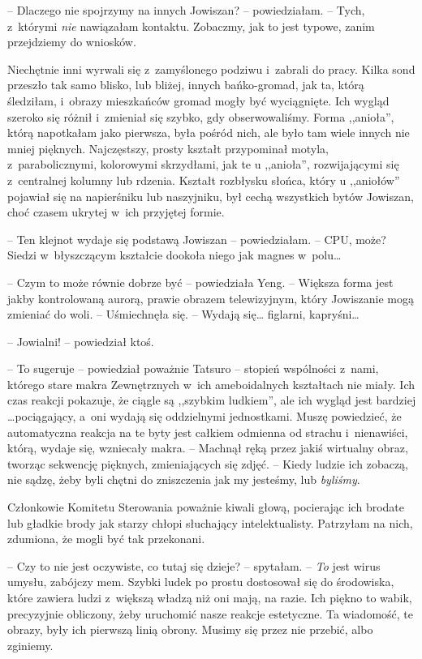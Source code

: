 \documentclass[oneside,polish,11pt,sfheadings]{mwbk}
\begin{document}
-- Dlaczego nie spojrzymy na innych Jowiszan? -- powiedziałam. -- Tych, z~którymi \textit{nie} nawiązałam kontaktu. Zobaczmy, jak to jest typowe,
zanim przejdziemy do wniosków.

Niechętnie inni wyrwali się z~zamyślonego podziwu i~zabrali do pracy.
Kilka sond przeszło tak samo blisko, lub bliżej, innych bańko-gromad,
jak ta, którą śledziłam, i~obrazy mieszkańców gromad mogły być
wyciągnięte. Ich wygląd szeroko się różnił i~zmieniał się szybko, gdy
obserwowaliśmy. Forma ,,anioła'', którą napotkałam jako pierwsza, była
pośród nich, ale było tam wiele innych nie mniej pięknych. Najczęstszy,
prosty kształt przypominał motyla, z~parabolicznymi, kolorowymi
skrzydłami, jak te u ,,anioła'', rozwijającymi się z~centralnej kolumny
lub rdzenia. Kształt rozbłysku słońca, który u ,,aniołów'' pojawiał się
na napierśniku lub naszyjniku, był cechą wszystkich bytów Jowiszan, choć
czasem ukrytej w~ich przyjętej formie.

-- Ten klejnot wydaje się podstawą Jowiszan -- powiedziałam. -- CPU, może?
Siedzi w~błyszczącym kształcie dookoła niego jak magnes w~polu\ldots 

-- Czym to może równie dobrze być -- powiedziała Yeng. -- Większa forma
jest jakby kontrolowaną aurorą, prawie obrazem telewizyjnym, który
Jowiszanie mogą zmieniać do woli. -- Uśmiechnęła się. -- Wydają się\ldots 
figlarni, kapryśni\ldots 

-- Jowialni! -- powiedział ktoś.

-- To sugeruje -- powiedział poważnie Tatsuro -- stopień wspólności z~nami,
którego stare makra Zewnętrznych w~ich ameboidalnych kształtach nie
miały. Ich czas reakcji pokazuje, że ciągle są ,,szybkim ludkiem'', ale
ich wygląd jest bardziej \ldots  pociągający, a~oni wydają się oddzielnymi
jednostkami. Muszę powiedzieć, że automatyczna reakcja na te byty jest
całkiem odmienna od strachu i~nienawiści, którą, wydaje się, wzniecały
makra. -- Machnął ręką przez jakiś wirtualny obraz, tworząc sekwencję
pięknych, zmieniających się zdjęć. -- Kiedy ludzie ich zobaczą, nie
sądzę, żeby byli chętni do zniszczenia jak my jesteśmy, lub
\textit{byliśmy}.

Członkowie Komitetu Sterowania poważnie kiwali głową, pocierając ich
brodate lub gładkie brody jak starzy chłopi słuchający intelektualisty.
Patrzyłam na nich, zdumiona, że mogli być tak przekonani.

-- Czy to nie jest oczywiste, co tutaj się dzieje? -- spytałam. -- \textit{To} jest wirus umysłu, zabójczy mem. Szybki ludek po prostu
dostosował się do środowiska, które zawiera ludzi z~większą władzą niż
oni mają, na razie. Ich piękno to wabik, precyzyjnie obliczony, żeby
uruchomić nasze reakcje estetyczne. Ta wiadomość, te obrazy, były ich
pierwszą linią obrony. Musimy się przez nie przebić, albo zginiemy.
\end{document}
